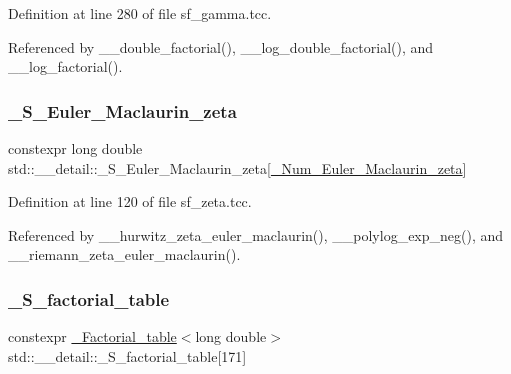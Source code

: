Definition at line 280 of file sf\+\_\+gamma.\+tcc.



Referenced by \+\_\+\+\_\+double\+\_\+factorial(), \+\_\+\+\_\+log\+\_\+double\+\_\+factorial(), and \+\_\+\+\_\+log\+\_\+factorial().

\mbox{\label{namespacestd_1_1____detail_acd941b49595dd03e93c88107ad2f68c2}} 
\subsubsection{\texorpdfstring{\+\_\+\+S\+\_\+\+Euler\+\_\+\+Maclaurin\+\_\+zeta}{\_S\_Euler\_Maclaurin\_zeta}}
{\footnotesize\ttfamily constexpr long double std\+::\+\_\+\+\_\+detail\+::\+\_\+\+S\+\_\+\+Euler\+\_\+\+Maclaurin\+\_\+zeta\mbox{[}\hyperlink{namespacestd_1_1____detail_ab27e687e1052be7a72de187e0dead124}{\+\_\+\+Num\+\_\+\+Euler\+\_\+\+Maclaurin\+\_\+zeta}\mbox{]}}



Definition at line 120 of file sf\+\_\+zeta.\+tcc.



Referenced by \+\_\+\+\_\+hurwitz\+\_\+zeta\+\_\+euler\+\_\+maclaurin(), \+\_\+\+\_\+polylog\+\_\+exp\+\_\+neg(), and \+\_\+\+\_\+riemann\+\_\+zeta\+\_\+euler\+\_\+maclaurin().

\mbox{\label{namespacestd_1_1____detail_a008b54abe31c1027aefdfd7a76a40e99}} 
\subsubsection{\texorpdfstring{\+\_\+\+S\+\_\+factorial\+\_\+table}{\_S\_factorial\_table}}
{\footnotesize\ttfamily constexpr \hyperlink{structstd_1_1____detail_1_1__Factorial__table}{\+\_\+\+Factorial\+\_\+table}$<$long double$>$ std\+::\+\_\+\+\_\+detail\+::\+\_\+\+S\+\_\+factorial\+\_\+table\mbox{[}171\mbox{]}}



